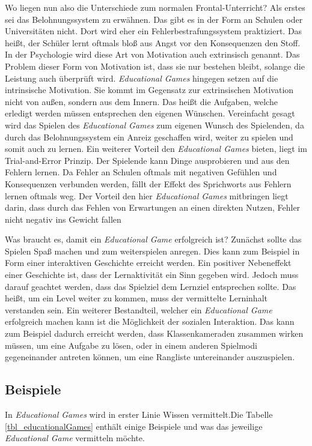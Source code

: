 Wo liegen nun also die Unterschiede zum normalen Frontal-Unterricht? Als erstes sei das Belohnungssystem zu erwähnen. Das gibt es in der Form an Schulen oder Universitäten nicht. Dort wird eher ein Fehlerbestrafungssystem praktiziert. Das heißt, der Schüler lernt oftmals bloß aus Angst vor den Konsequenzen den Stoff. In der Psychologie wird diese Art von Motivation auch extrinsisch genannt. Das Problem dieser Form von Motivation ist, dass sie nur bestehen bleibt, solange die Leistung auch überprüft wird. \textit{Educational Games} hingegen setzen auf die intrinsische Motivation. Sie kommt im Gegensatz zur extrinsischen Motivation nicht von außen, sondern aus dem Innern. Das heißt die Aufgaben, welche erledigt werden müssen entsprechen den eigenen Wünschen. Vereinfacht gesagt wird das Spielen des \textit{Educational Games} zum eigenen Wunsch des Spielenden, da durch das Belohnungssystem ein Anreiz geschaffen wird, weiter zu spielen und somit auch zu lernen. Ein weiterer Vorteil den \textit{Educational Games} bieten, liegt im \glqq Trial-and-Error \grqq Prinzip. Der Spielende kann Dinge ausprobieren und aus den Fehlern lernen. Da Fehler an Schulen oftmals mit negativen Gefühlen und Konsequenzen verbunden werden, fällt der Effekt des Sprichworts \glqq aus Fehlern lernen \grqq oftmals weg. Der Vorteil den hier \textit{Educational Games} mitbringen liegt darin, dass durch das Fehlen von Erwartungen an einen direkten Nutzen, Fehler nicht negativ ins Gewicht fallen \cite{F_VorteileEducationalGames_3.2.2}

Was braucht es, damit ein \textit{Educational Game} erfolgreich ist? Zunächst sollte das Spielen Spaß machen und zum weiterspielen anregen. Dies kann zum Beispiel in Form einer interaktiven Geschichte erreicht werden. Ein positiver Nebeneffekt einer Geschichte ist, dass der Lernaktivität ein Sinn gegeben wird. Jedoch muss darauf geachtet werden, dass das Spielziel dem Lernziel entsprechen sollte. Das heißt, um ein Level weiter zu kommen, muss der vermittelte Lerninhalt verstanden sein. Ein weiterer Bestandteil, welcher ein \textit{Educational Game} erfolgreich machen kann ist die Möglichkeit der sozialen Interaktion. Das kann zum Beispiel dadurch erreicht werden, dass Klassenkameraden zusammen wirken müssen, um eine Aufgabe zu lösen, oder in einem anderen Spielmodi gegeneinander antreten können, um eine Rangliste untereinander auszuspielen. \cite{ F_erfolgreicheEducationalGames_3.2}

\subsection{Beispiele}
In \textit{Educational Games} wird in erster Linie Wissen vermittelt.Die Tabelle \ref{tbl_educationalGames} enthält einige Beispiele und was das jeweilige \textit{Educational Game} vermitteln möchte.\newline

